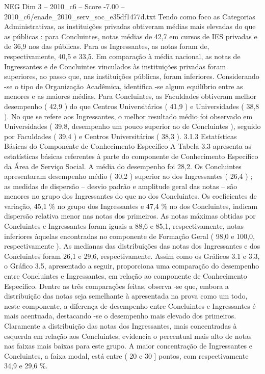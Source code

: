 \begin{textsample}{NEG Dim 3 – 2010\_c6 – Score -7.00 – 2010\_c6/enade\_2010\_serv\_soc\_e35df1477d.txt}
Tendo como foco as Categorias Administrativas, as instituições privadas obtiveram médias mais elevadas do que as públicas : para Concluintes, notas médias de 42,7 em cursos de IES privadas e de 36,9 nos das públicas.
Para os Ingressantes, as notas foram de, respectivamente, 40,5 e 33,5.
Em comparação à média nacional, as notas de Ingressantes e de Concluintes vinculados às instituições privadas foram superiores, ao passo que, nas instituições públicas, foram inferiores.
Considerando -se o tipo de Organização Acadêmica, identifica -se algum equilíbrio entre as menores e as maiores médias.
Para Concluintes, as Faculdades obtiveram melhor desempenho ( 42,9 ) do que Centros Universitários ( 41,9 ) e Universidades ( 38,8 ).
No que se refere aos Ingressantes, o melhor resultado médio foi observado em Universidades ( 39,8, desempenho um pouco superior ao de Concluintes ), seguido por Faculdades ( 39,4 ) e Centros Universitários ( 38,3 ). 3.1.3 Estatísticas Básicas do Componente de Conhecimento Específico A Tabela 3.3 apresenta as estatísticas básicas referentes à parte do componente de Conhecimento Específico da Área de Serviço Social.
A média do desempenho foi 28,2.
Os Concluintes apresentaram desempenho médio ( 30,2 ) superior ao dos Ingressantes ( 26,4 ) ; as medidas de dispersão – desvio padrão e amplitude geral das notas – são menores no grupo dos Ingressantes do que no dos Concluintes.
Os coeficientes de variação, 45,1 \% no grupo dos Ingressantes e 47,4 \% no dos Concluintes, indicam dispersão relativa menor nas notas dos primeiros.
As notas máximas obtidas por Concluintes e Ingressantes foram iguais a 88,6 e 85,1, respectivamente, notas inferiores àquelas encontradas no componente de Formação Geral ( 98,0 e 100,0, respectivamente ).
As medianas das distribuições das notas dos Ingressantes e dos Concluintes foram 26,1 e 29,6, respectivamente.
Assim como os Gráficos 3.1 e 3.3, o Gráfico 3.5, apresentado a seguir, proporciona uma comparação do desempenho entre Concluintes e Ingressantes, em relação ao componente de Conhecimento Específico.
Dentre as três comparações feitas, observa -se que, embora a distribuição das notas seja semelhante à apresentada na prova como um todo, neste componente, a diferença de desempenho entre Concluintes e Ingressantes é mais acentuada, destacando -se o desempenho mais elevado dos primeiros.
Claramente a distribuição das notas dos Ingressantes, mais concentradas à esquerda em relação aos Concluintes, evidencia o percentual mais alto de notas nas faixas mais baixas para este grupo.
A maior concentração de Ingressantes e Concluintes, a faixa modal, está entre ( 20 e 30 ] pontos, com respectivamente 34,9 e 29,6 \%.

\end{textsample}
